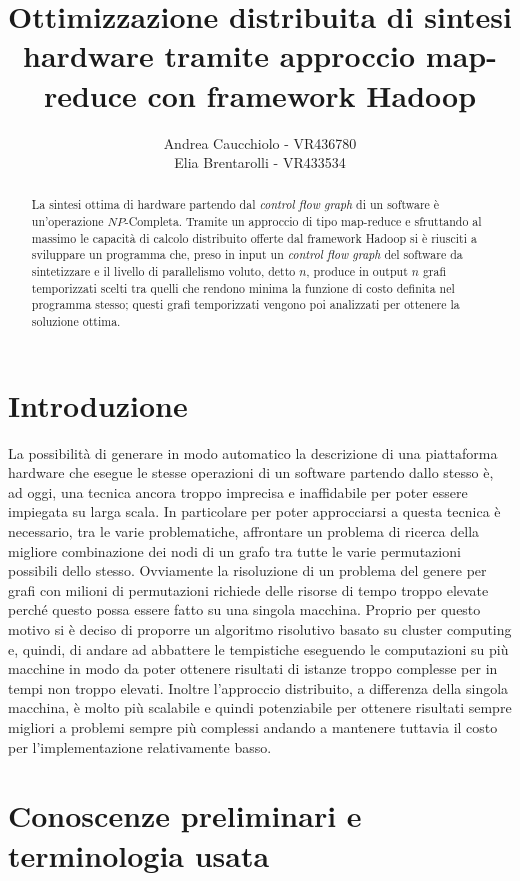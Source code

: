 \documentclass[]{IEEEtran}
\title{Ottimizzazione distribuita di sintesi hardware tramite approccio map-reduce con framework Hadoop}
\author{Andrea Caucchiolo - VR436780\\Elia Brentarolli - VR433534}
\begin{document}
\maketitle

\begin{abstract}
	
La sintesi ottima di hardware partendo dal \emph{control flow graph} di un software è un'operazione $NP$-Completa. Tramite un  approccio di tipo map-reduce e sfruttando al massimo le capacità di calcolo distribuito offerte dal framework Hadoop  si è riusciti a sviluppare un programma che, preso in input un \emph{control flow graph} del software da sintetizzare e il livello di parallelismo voluto, detto $n$, produce in output $n$ grafi temporizzati scelti tra quelli che rendono minima la funzione di costo definita nel programma stesso; questi grafi temporizzati vengono poi analizzati per ottenere la soluzione ottima.

\end{abstract}


\section{Introduzione}

La possibilità di generare in modo automatico la descrizione di una piattaforma hardware che esegue le stesse operazioni di un software partendo dallo stesso è, ad oggi, una tecnica ancora troppo imprecisa e inaffidabile per poter essere impiegata su larga scala. In particolare per poter approcciarsi a questa tecnica è necessario, tra le varie problematiche, affrontare un problema di ricerca della migliore combinazione dei nodi di un grafo tra tutte le varie permutazioni possibili dello stesso. Ovviamente la risoluzione di un problema del genere per grafi con milioni di permutazioni richiede delle risorse di tempo troppo elevate perché questo possa essere fatto su una singola macchina. Proprio per questo motivo si è deciso di proporre un algoritmo risolutivo basato su cluster computing e, quindi, di andare ad abbattere le tempistiche eseguendo le computazioni su più macchine in modo da poter ottenere risultati di istanze troppo complesse per in tempi non troppo elevati. Inoltre l'approccio distribuito, a differenza della singola macchina, è molto più scalabile e quindi potenziabile per ottenere risultati sempre migliori a problemi sempre più complessi andando a mantenere tuttavia il costo per l'implementazione relativamente basso.

\section{Conoscenze preliminari e terminologia usata}
\end{document}
